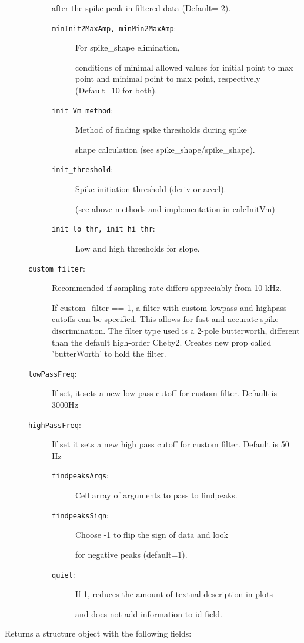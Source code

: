 \begin{description}
\begin{description}
after the spike peak in filtered data (Default=-2).
\begin{description}%
\item[\texttt{minInit2MaxAmp, minMin2MaxAmp}:]
 For spike\_shape elimination,

conditions of minimal allowed values for 
initial point to max point and minimal point to 
max point, respectively (Default=10 for both).
\item[\texttt{init\_Vm\_method}:]
 Method of finding spike thresholds during spike

shape calculation (see spike\_shape/spike\_shape).
\item[\texttt{init\_threshold}:]
 Spike initiation threshold (deriv or accel).

(see above methods and implementation in calcInitVm)
\item[\texttt{init\_lo\_thr, init\_hi\_thr}:]
 Low and high thresholds for slope.
\end{description}%
\item[\texttt{custom\_filter}:]
 Recommended if sampling rate differs appreciably from 10 kHz.

If custom\_filter == 1, a filter with custom lowpass and highpass
cutoffs can be specified. This allows for fast and accurate spike
discrimination. The filter type used is a 2-pole
butterworth, different than the default high-order
Cheby2. Creates new prop called 'butterWorth' to
hold the filter.
\item[\texttt{lowPassFreq}:]
 If set, it sets a new low pass cutoff for custom filter. Default is 3000Hz
\item[\texttt{highPassFreq}:]
 If set it sets a new high pass cutoff for custom filter. Default is 50 Hz
\begin{description}%
\item[\texttt{findpeaksArgs}:]
 Cell array of arguments to pass to findpeaks.
\item[\texttt{findpeaksSign}:]
 Choose -1 to flip the sign of data and look

for negative peaks (default=1).
\item[\texttt{quiet}:]
 If 1, reduces the amount of textual description in plots

and does not add information to id field.
\end{description}%
\end{description}%
%
\item[Returns a structure object with the following fields:
]~


\end{description}
